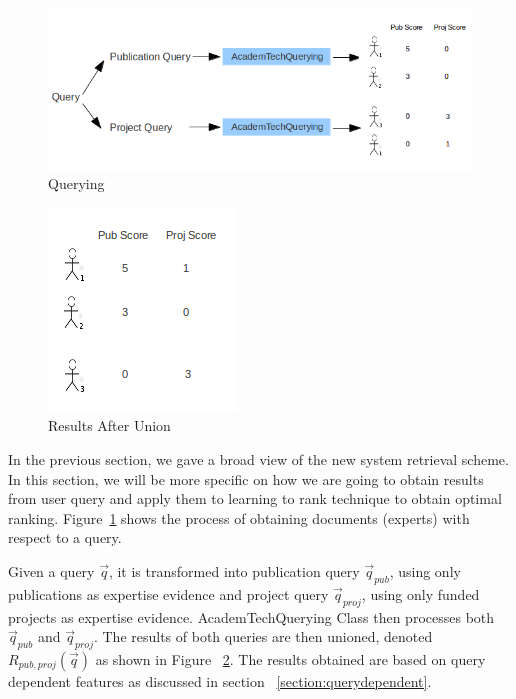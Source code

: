 \begin{figure}
\centering
\includegraphics[scale=0.4]{./figures/querying.png}
\caption{Querying} \label{fig:quering} 
\end{figure}
\quad
\begin{figure}
\centering
\includegraphics[scale=0.7]{./figures/union.png}
\caption{Results After Union} \label{fig:union} 
\end{figure}
In the previous section, we gave a broad view of the new system retrieval scheme. In this section, we will be more specific on how we are going to 
obtain results from user query and apply them to learning to rank technique to obtain optimal ranking.
Figure~\ref{fig:quering} shows the process of obtaining documents (experts) with respect to a query. 

Given a query $\vec{q}$, it is transformed into publication query $\vec{q}_{pub}$, using only publications as expertise evidence and project
query $\vec{q}_{proj}$, using only funded projects as expertise evidence. 
AcademTechQuerying Class then processes both $\vec{q}_{pub}$ and $\vec{q}_{proj}$. The results of both
queries are then unioned, denoted $R_{pub,proj}(\vec{q})$ as shown in Figure ~\ref{fig:union}. The results obtained are based on query dependent features as discussed in section 
~\ref{section:querydependent}.

